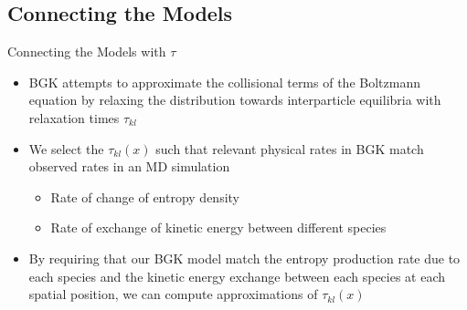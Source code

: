 \documentclass{beamer}
\begin{document}
	\subsection{Connecting the Models}
	\begin{frame}{Connecting the Models with $\tau$}
		\begin{itemize}
		\item BGK attempts to approximate the collisional terms of the Boltzmann equation by relaxing the distribution towards interparticle equilibria with relaxation times $\tau_{kl}$
		\vspace{0.5em}
		\item We select the $\tau_{kl}(x)$ such that relevant physical rates in BGK match observed rates in an MD simulation
		\vspace{0.5em}\begin{itemize}
		\item Rate of change of entropy density\vspace{0.5em}
		\item Rate of exchange of kinetic energy between different species\end{itemize}\vspace{0.5em}
		\item By requiring that our BGK model match the entropy production rate due to each species and the kinetic energy exchange between each species at each spatial position, we can compute approximations of $\tau_{kl}(x)$
		
		\end{itemize}
	\end{frame}
	
\end{document}
